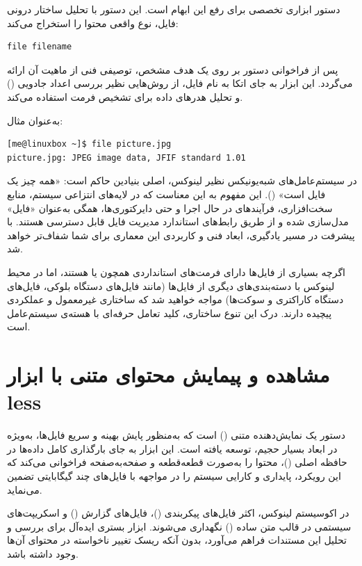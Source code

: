 دستور  ابزاری تخصصی برای رفع این ابهام است. این دستور با تحلیل ساختار درونی فایل، نوع واقعی محتوا را استخراج می‌کند:

\begin{latin}
\begin{lstlisting}
file filename
\end{lstlisting}
\end{latin}

پس از فراخوانی دستور  بر روی یک هدف مشخص، توصیفی فنی از ماهیت آن ارائه می‌گردد. این ابزار به جای اتکا به نام فایل، از روش‌هایی نظیر بررسی اعداد جادویی () و تحلیل هدرهای داده برای تشخیص فرمت استفاده می‌کند.

به‌عنوان مثال:

\begin{latin}
\begin{lstlisting}
[me@linuxbox ~]$ file picture.jpg
picture.jpg: JPEG image data, JFIF standard 1.01
\end{lstlisting}
\end{latin}

در سیستم‌عامل‌های شبه‌یونیکس نظیر لینوکس، اصلی بنیادین حاکم است: «همه چیز یک فایل است» (). این مفهوم به این معناست که در لایه‌های انتزاعی سیستم، منابع سخت‌افزاری، فرآیندهای در حال اجرا و حتی دایرکتوری‌ها، همگی به‌عنوان «فایل» مدل‌سازی شده و از طریق رابط‌های استاندارد مدیریت فایل قابل دسترسی هستند. با پیشرفت در مسیر یادگیری، ابعاد فنی و کاربردی این معماری برای شما شفاف‌تر خواهد شد.

اگرچه بسیاری از فایل‌ها دارای فرمت‌های استانداردی همچون  یا  هستند، اما در محیط لینوکس با دسته‌بندی‌های دیگری از فایل‌ها (مانند فایل‌های دستگاه بلوکی، فایل‌های دستگاه کاراکتری و سوکت‌ها) مواجه خواهید شد که ساختاری غیرمعمول و عملکردی پیچیده دارند. درک این تنوع ساختاری، کلید تعامل حرفه‌ای با هسته‌ی سیستم‌عامل است.

\section{مشاهده و پیمایش محتوای متنی با ابزار less}

دستور  یک نمایش‌دهنده متنی () است که به‌منظور پایش بهینه و سریع فایل‌ها، به‌ویژه در ابعاد بسیار حجیم، توسعه یافته است. این ابزار به جای بارگذاری کامل داده‌ها در حافظه اصلی ()، محتوا را به‌صورت قطعه‌قطعه و صفحه‌به‌صفحه فراخوانی می‌کند که این رویکرد، پایداری و کارایی سیستم را در مواجهه با فایل‌های چند گیگابایتی تضمین می‌نماید.

در اکوسیستم لینوکس، اکثر فایل‌های پیکربندی ()، فایل‌های گزارش () و اسکریپت‌های سیستمی در قالب متن ساده () نگهداری می‌شوند. ابزار  بستری ایده‌آل برای بررسی و تحلیل این مستندات فراهم می‌آورد، بدون آنکه ریسک تغییر ناخواسته در محتوای آن‌ها وجود داشته باشد.

